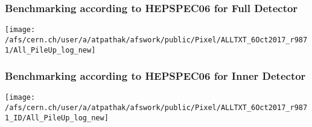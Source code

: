 \documentclass{beamer}
\begin{document}
\begin{frame}
\frametitle{Benchmarking according to HEPSPEC06 for Full Detector}

\begin{center}
\begin{normalsize}


\vspace*{-.2cm}
\begin{center}
\texttt{[image: /afs/cern.ch/user/a/atpathak/afswork/public/Pixel/ALLTXT\_6Oct2017\_r9871/All\_PileUp\_log\_new]}
\end{center}
\end{normalsize}
\end{center}
\end{frame}
\begin{frame}
\frametitle{Benchmarking according to HEPSPEC06 for Inner Detector}

\begin{center}
\begin{normalsize}


\vspace*{-.2cm}
\begin{center}
\texttt{[image: /afs/cern.ch/user/a/atpathak/afswork/public/Pixel/ALLTXT\_6Oct2017\_r9871\_ID/All\_PileUp\_log\_new]}
\end{center}
\end{normalsize}
\end{center}
\end{frame}
\end{document}

